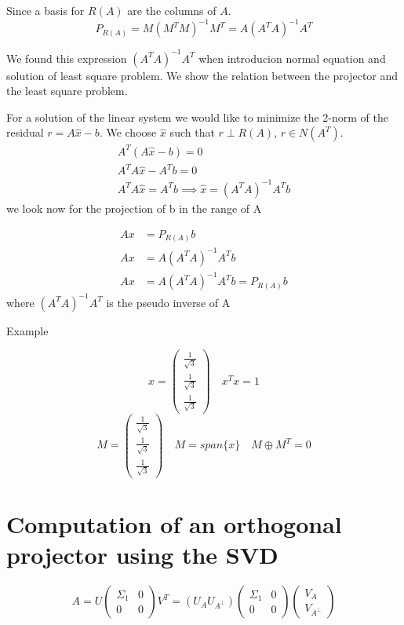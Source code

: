 Since a basis for $R(A)$ are the columns of $A$.
$$ P_{R(A)} = M(M^TM)^{-1}M^T = A(A^TA)^{-1}A^T$$

We found this expression $(A^TA)^{-1}A^T$ when introducion normal equation and solution of least square problem.
We show the relation between the projector and the least square problem.

For a solution of the linear system we would like to minimize the 2-norm of the residual $r = A\hat{x} - b$.
We choose $\hat{x}$ such that $r \perp R(A)$, $r \in N(A^T)$.
$$
\begin{aligned}
    A^T(A\hat{x} - b) = 0 \\
    A^TA\hat{x} - A^Tb = 0 \\
    A^TA\hat{x} = A^Tb \implies \hat{x} = (A^TA)^{-1}A^Tb    
\end{aligned}
$$
we look now for the projection of b in the range of A


$$
\begin{aligned}
Ax &= P_{R(A)}b \\
Ax &= A(A^TA)^{-1}A^Tb \\
Ax &= A(A^TA)^{-1}A^Tb = P_{R(A)}b
\end{aligned}
$$
where $(A^TA)^{-1}A^T$ is the pseudo inverse of A

Example

$$
x = \begin{pmatrix}
    \frac{1}{\sqrt{3}} \\
    \frac{1}{\sqrt{3}} \\
    \frac{1}{\sqrt{3}}
\end{pmatrix} \quad
x^Tx = 1
$$
$$
M = \begin{pmatrix}
    \frac{1}{\sqrt{3}} \\
    \frac{1}{\sqrt{3}} \\
    \frac{1}{\sqrt{3}}
\end{pmatrix} \quad M = span\{x\} \quad M \oplus M^T = 0
$$


\section{Computation of an orthogonal projector using the SVD}
$$
A = U\begin{pmatrix}
    \Sigma_1 & 0 \\
    0 & 0
\end{pmatrix}V^T
= (U_A U_{A^{\perp}})\begin{pmatrix}
    \Sigma_1 & 0 \\
    0 & 0
\end{pmatrix}
\begin{pmatrix}
 V_A \\
 V_{A^{\perp}}
\end{pmatrix}
$$

